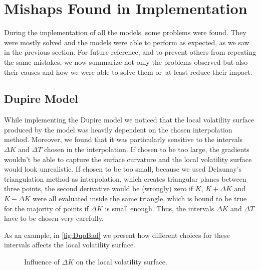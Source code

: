 \newpage

\section{Mishaps Found in Implementation}
During the implementation of all the models, some problems were found. They were mostly solved and the models were able to perform as expected, as we saw in the previous section. For future reference, and to prevent others from repeating the same mistakes, we now summarize not only the problems observed but also their causes and how we were able to solve them or~at least reduce their impact.

\subsection{Dupire Model}
While implementing the Dupire model we noticed that the local volatility surface produced by the model was heavily dependent on the chosen interpolation method. Moreover, we found that it was particularly sensitive to the intervals $\Delta K$ and $\Delta T$ chosen in the interpolation. If chosen to be too large, the gradients wouldn't be able to capture the surface curvature and the local volatility surface would look unrealistic. If chosen to be too small, because we used Delaunay's triangulation method as interpolation, which creates triangular planes between three points, the second derivative would be (wrongly) zero if $K$, $K+\Delta K$ and $K-\Delta K$ were all evaluated inside the same triangle, which is bound to be true for the majority of points if $\Delta K$ is small enough.
Thus, the intervals $\Delta K$ and $\Delta T$ have to be chosen very carefully.

As an example, in \autoref{fig:DupBad} we present how different choices for these intervals affects the local volatility surface.

\begin{figure}[H]
  \begin{subfigmatrix}{2}
  \end{subfigmatrix}
    \caption[Influence of $\Delta K$ on the local volatility surface.]{Influence of $\Delta K$ on the local volatility surface.}\label{fig:DupBad}
\end{figure} 

